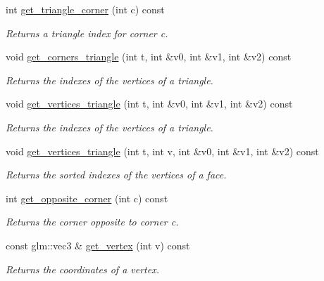 \begin{DoxyCompactItemize}
int \hyperlink{classgeoproc_1_1TriangleMesh_a8f4d4fc9ea8c907d154605eee686807e}{get\+\_\+triangle\+\_\+corner} (int c) const
\begin{DoxyCompactList}\small\item\em Returns a triangle index for corner {\itshape c}. \end{DoxyCompactList}\item 
void \hyperlink{classgeoproc_1_1TriangleMesh_acd89c54ec14ddfb5d38f1baedb717fc2}{get\+\_\+corners\+\_\+triangle} (int t, int \&v0, int \&v1, int \&v2) const
\begin{DoxyCompactList}\small\item\em Returns the indexes of the vertices of a triangle. \end{DoxyCompactList}\item 
void \hyperlink{classgeoproc_1_1TriangleMesh_aab448f6f589f4c329b4daca635d9d865}{get\+\_\+vertices\+\_\+triangle} (int t, int \&v0, int \&v1, int \&v2) const
\begin{DoxyCompactList}\small\item\em Returns the indexes of the vertices of a triangle. \end{DoxyCompactList}\item 
void \hyperlink{classgeoproc_1_1TriangleMesh_af315fcda4f23dc0f3e9041e6d6d24601}{get\+\_\+vertices\+\_\+triangle} (int t, int v, int \&v0, int \&v1, int \&v2) const
\begin{DoxyCompactList}\small\item\em Returns the sorted indexes of the vertices of a face. \end{DoxyCompactList}\item 
int \hyperlink{classgeoproc_1_1TriangleMesh_a0ea38352c56a76d6def1fce67253f433}{get\+\_\+opposite\+\_\+corner} (int c) const
\begin{DoxyCompactList}\small\item\em Returns the corner opposite to corner c. \end{DoxyCompactList}\item 
const glm\+::vec3 \& \hyperlink{classgeoproc_1_1TriangleMesh_a9c231aaac3dfbfe9b6334df6cabb741e}{get\+\_\+vertex} (int v) const
\begin{DoxyCompactList}\small\item\em Returns the coordinates of a vertex. \end{DoxyCompactList}\item 
\mbox{\label{classgeoproc_1_1TriangleMesh_a5dcfcb21cbd8e737813ff17cf5ecc566}} 

\end{DoxyCompactItemize}
